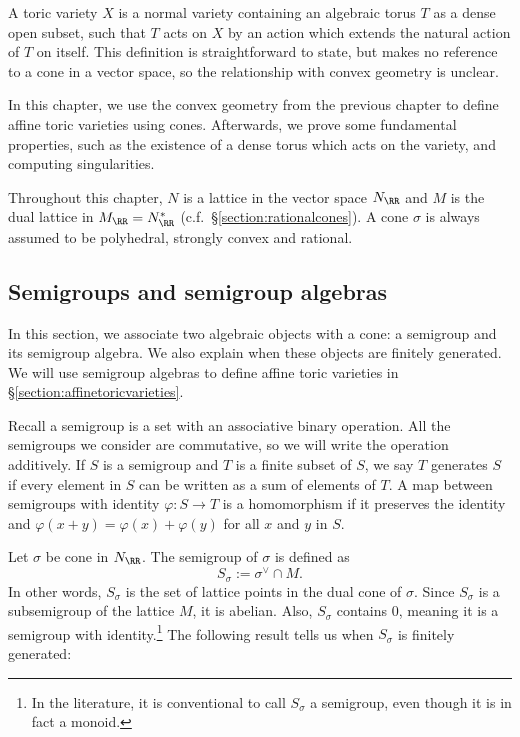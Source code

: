 \documentclass[12pt]{amsart}
\theoremstyle{plain}
\begin{document}
A toric variety $X$ is a normal variety containing an algebraic torus $T$ as a dense open subset, such that $T$ acts on $X$ by an action which extends the natural action of $T$ on itself.
This definition is straightforward to state, but makes no reference to a cone in a vector space, so the relationship with convex geometry is unclear.

In this chapter, we use the convex geometry from the previous chapter to define affine toric varieties using cones.
Afterwards, we prove some fundamental properties, such as the existence of a dense torus which acts on the variety, and computing singularities.

Throughout this chapter, $N$ is a lattice in the vector space $N_\RR$ and $M$ is the dual lattice in $M_\RR = N_\RR^*$ (c.f.\ \S \ref{section:rationalcones}).
A cone $\sigma$ is always assumed to be polyhedral, strongly convex and rational.






\subsection{Semigroups and semigroup algebras}
In this section, we associate two algebraic objects with a cone: a semigroup and its semigroup algebra.
We also explain when these objects are finitely generated.
We will use semigroup algebras to define affine toric varieties in \S \ref{section:affinetoricvarieties}.

Recall a semigroup is a set with an associative binary operation.
All the semigroups we consider are commutative, so we will write the operation additively.
If $S$ is a semigroup and $T$ is a finite subset of $S$, we say $T$ generates $S$ if every element in $S$ can be written as a sum of elements of $T$.
A map between semigroups with identity $\varphi : S \to T$ is a homomorphism if it preserves the identity and $\varphi(x + y) = \varphi(x) + \varphi(y)$ for all $x$ and $y$ in $S$.

Let $\sigma$ be cone in $N_\RR$.
The semigroup of $\sigma$ is defined as
$$S_\sigma := \sigma^\vee \cap M.$$
In other words, $S_\sigma$ is the set of lattice points in the dual cone of $\sigma$.
Since $S_\sigma$ is a subsemigroup of the lattice $M$, it is abelian.
Also, $S_\sigma$ contains $0$, meaning it is a semigroup with identity.\footnote{In the literature, it is conventional to call $S_\sigma$ a semigroup, even though it is in fact a monoid.}
The following result tells us when $S_\sigma$ is finitely generated:
\end{document}

